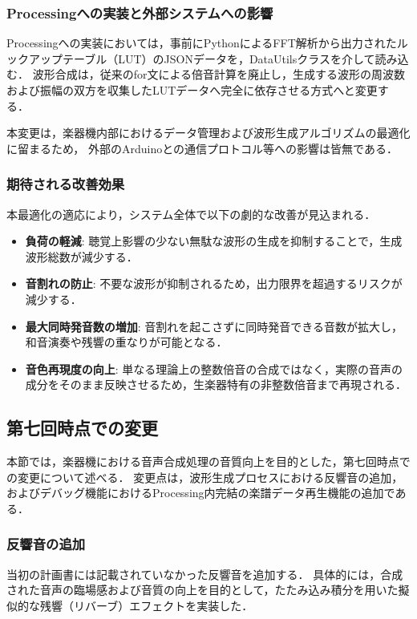 \documentclass[lualatex,book,paper=a4paper,jafontsize=11.5pt,jafontscale=1.05]{jlreq}
\begin{document}
\subsubsection{Processingへの実装と外部システムへの影響}
Processingへの実装においては，事前にPythonによるFFT解析から出力されたルックアップテーブル（LUT）のJSONデータを，DataUtilsクラスを介して読み込む．
波形合成は，従来のfor文による倍音計算を廃止し，生成する波形の周波数および振幅の双方を収集したLUTデータへ完全に依存させる方式へと変更する．

本変更は，楽器機内部におけるデータ管理および波形生成アルゴリズムの最適化に留まるため，
外部のArduinoとの通信プロトコル等への影響は皆無である．

\subsubsection{期待される改善効果}
本最適化の適応により，システム全体で以下の劇的な改善が見込まれる．
\begin{itemize}
    \item \textbf{負荷の軽減}: 聴覚上影響の少ない無駄な波形の生成を抑制することで，生成波形総数が減少する．
    \item \textbf{音割れの防止}: 不要な波形が抑制されるため，出力限界を超過するリスクが減少する．
    \item \textbf{最大同時発音数の増加}: 音割れを起こさずに同時発音できる音数が拡大し，和音演奏や残響の重なりが可能となる．
    \item \textbf{音色再現度の向上}: 単なる理論上の整数倍音の合成ではなく，実際の音声の成分をそのまま反映させるため，生楽器特有の非整数倍音まで再現される．
\end{itemize}

\subsection{第七回時点での変更}
本節では，楽器機における音声合成処理の音質向上を目的とした，第七回時点での変更について述べる．
変更点は，波形生成プロセスにおける反響音の追加，およびデバッグ機能におけるProcessing内完結の楽譜データ再生機能の追加である．

\subsubsection{反響音の追加}
当初の計画書には記載されていなかった反響音を追加する．
具体的には，合成された音声の臨場感および音質の向上を目的として，たたみ込み積分を用いた擬似的な残響（リバーブ）エフェクトを実装した．
\end{document}
